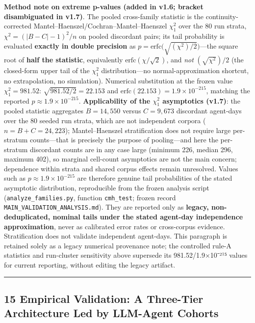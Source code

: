 \documentclass[
  11pt]{article}
\begin{document}
\textbf{Method note on extreme p-values (added in v1.6; bracket
disambiguated in v1.7)}. The pooled cross-family statistic is the
continuity-corrected Mantel--Haenszel/Cochran--Mantel--Haenszel
\(\chi^2_1\) over the 80 run strata, \(\chi^2 = (|B - C| - 1)^2 / n\) on
pooled discordant pairs; its tail probability is evaluated
\textbf{exactly in double precision} as
\(p = \mathrm{erfc}\big(\sqrt{(\chi^2)/2}\big)\)---the square root of
\textbf{half the statistic}, equivalently
\(\mathrm{erfc}(\chi/\sqrt{2})\), and \emph{not} \((\sqrt{\chi^2})/2\)
(the closed-form upper tail of the \(\chi^2_1\) distribution---no
normal-approximation shortcut, no extrapolation, no simulation).
Numerical substitution at the frozen value \(\chi^2_1 = 981.52\):
\(\sqrt{981.52/2} = 22.153\) and
\(\mathrm{erfc}(22.153) = 1.9\times10^{-215}\), matching the reported
\(p \approx 1.9\times10^{-215}\). \textbf{Applicability of the
\(\chi^2_1\) asymptotics (v1.7)}: the pooled statistic aggregates
\(B = 14{,}550\) versus \(C = 9{,}673\) discordant agent-days over the
80 seeded run strata, which are not independent corpora
(\(n = B + C = 24{,}223\)); Mantel--Haenszel stratification does not
require large per-stratum counts---that is precisely the purpose of
pooling---and here the per-stratum discordant counts are in any case
large (minimum 226, median 296, maximum 402), so marginal cell-count
asymptotics are not the main concern; dependence within strata and
shared corpus effects remain unresolved. Values such as
\(p \approx 1.9\times10^{-215}\) are therefore genuine tail
probabilities of the stated asymptotic distribution, reproducible from
the frozen analysis script (\texttt{analyze\_families.py}, function
\texttt{cmh\_test}; frozen record
\texttt{MAIN\_VALIDATION\_ANALYSIS.md}). They are reported only as
\textbf{legacy, non-deduplicated, nominal tails under the stated
agent-day independence approximation}, never as calibrated error rates
or cross-corpus evidence. Stratification does not validate independent
agent-days. This paragraph is retained solely as a legacy numerical
provenance note; the controlled rule-A statistics and run-cluster
sensitivity above supersede its 981.52/1.9×10⁻²¹⁵ values for current
reporting, without editing the legacy artifact.

\begin{center}\rule{0.5\linewidth}{0.5pt}\end{center}

\subsection{15 Empirical Validation: A Three-Tier Architecture Led by
LLM-Agent
Cohorts}\label{empirical-validation-a-three-tier-architecture-led-by-llm-agent-cohorts}
\end{document}
